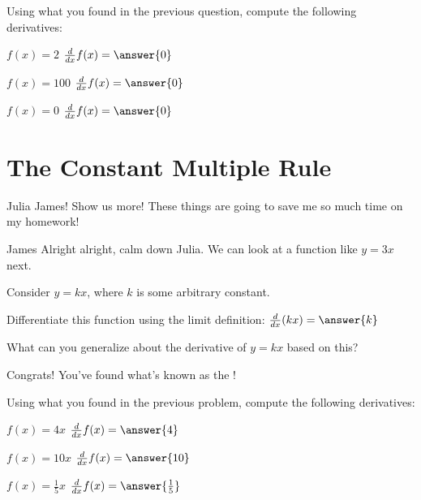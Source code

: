 \documentclass{ximera}
\begin{document}
\begin{question}
Using what you found in the previous question, compute the following derivatives:

$f(x)=2$ \hspace{14mm} $\frac{d}{dx} f(x) =  \answer{0}$

$f(x)=100$ \hspace{10mm} $\frac{d}{dx} f(x) =  \answer{0}$

$f(x)=0$ \hspace{13mm} $\frac{d}{dx} f(x) =  \answer{0}$

\end{question}

\section{The Constant Multiple Rule}
\begin{dialogue}
\item[Julia] James! Show us more! These things are going to save me so much time on my homework!
\item[James] Alright alright, calm down Julia. We can look at a function like $y = 3x$ next.
\end{dialogue}

Consider $y = kx$, where $k$ is some arbitrary constant.
\begin{question}
Differentiate this function using the limit definition:
$\frac{d}{dx} (kx) = \answer{k}$

What can you generalize about the derivative of $y = kx$ based on this?

\begin{multipleChoice}
\end{multipleChoice}
\begin{feedback}[correct]
Congrats! You've found what's known as the !
\end{feedback}
\end{question}

\begin{question}
\item{Using what you found in the previous problem, compute the following derivatives:}

$f(x) = 4x$ \hspace{12mm} $\frac{d}{dx} f(x) =  \answer{4}$

$f(x) = 10x$ \hspace{10mm} $\frac{d}{dx} f(x) =  \answer{10}$

$f(x) = \frac{1}{5}x$ \hspace{11mm} $\frac{d}{dx} f(x) =  \answer{\frac{1}{5}}$
\end{question}
\end{document}

